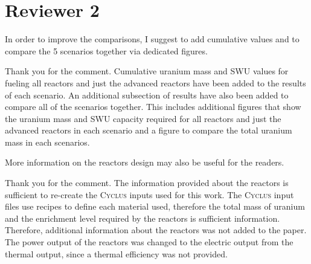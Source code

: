 \documentclass[answers,11pt]{exam}
\newcommand{\Cyclus}{\textsc{Cyclus}\xspace}%
\begin{document}
\section*{Reviewer 2}
\begin{questions}
        \question In order to improve the comparisons, I suggest to add 
        cumulative values and to compare the 5 scenarios together via dedicated 
        figures.
        \begin{solution}
                Thank you for the comment. Cumulative uranium mass and \gls{SWU} values
                for fueling all reactors and just the advanced reactors 
                have been added to the results of each scenario. An additional 
                subsection of results have also been added to compare all of the 
                scenarios together. This includes additional figures that show the 
                uranium mass and SWU capacity required for all reactors and just the 
                advanced reactors in each scenario and a figure to compare the total 
                uranium mass in each scenarios. 
        \end{solution}

        \question More information on the reactors design may also be useful 
        for the readers.
        \begin{solution}
                Thank you for the comment. The information provided about the reactors 
                is sufficient to re-create the \Cyclus inputs used for this work.
                The \Cyclus input files use recipes to define each material used, 
                therefore the total mass of uranium and the enrichment level 
                required by the reactors is sufficient information. Therefore, 
                additional information about the reactors was not added to the 
                paper. The power output of the reactors was changed to the electric 
                output from the thermal output, since a thermal efficiency was not 
                provided. 
        \end{solution}


\end{questions}
\end{document}
